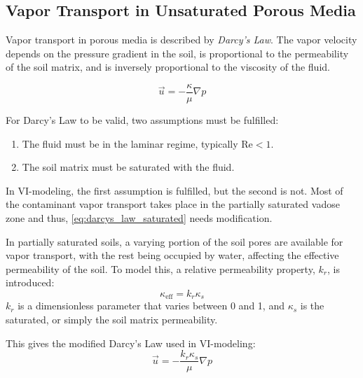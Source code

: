 \subsection{Vapor Transport in Unsaturated Porous Media}\label{sec:darcys}

Vapor transport in porous media is described by \textit{Darcy's Law}.
The vapor velocity depends on the pressure gradient in the soil, is proportional to the permeability of the soil matrix, and is inversely proportional to the viscosity of the fluid.

\begin{equation}\label{eq:darcys_law_saturated}
  \vec{u} = -\frac{\kappa}{\mu}\nabla p
\end{equation}

For Darcy's Law to be valid, two assumptions must be fulfilled:
\begin{enumerate}
  \item The fluid must be in the laminar regime, typically $\mathrm{Re} < 1$.
  \item The soil matrix must be saturated with the fluid.
\end{enumerate}
In VI-modeling, the first assumption is fulfilled, but the second is not.
Most of the contaminant vapor transport takes place in the partially saturated vadose zone and thus, \eqref{eq:darcys_law_saturated} needs modification.

In partially saturated soils, a varying portion of the soil pores are available for vapor transport, with the rest being occupied by water, affecting the effective permeability of the soil.
To model this, a relative permeability property, $k_r$, is introduced:
\begin{equation}
  \kappa_\mathrm{eff} = k_r \kappa_s
\end{equation}
$k_r$ is a dimensionless parameter that varies between 0 and 1, and $\kappa_s$ is the saturated, or simply the soil matrix permeability.

This gives the modified Darcy's Law used in VI-modeling:
\begin{equation}\label{eq:darcys_law}
  \vec{u} = -\frac{k_r \kappa_s}{\mu}\nabla p
\end{equation}
